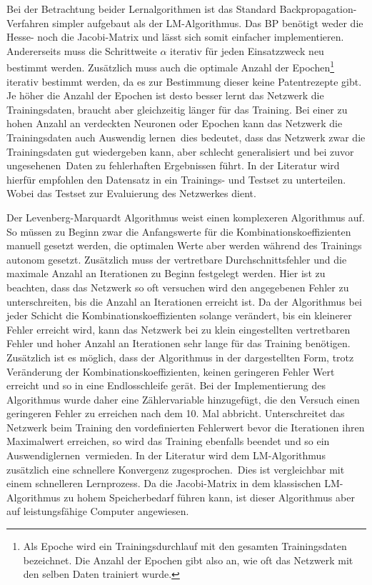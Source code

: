 Bei der Betrachtung beider Lernalgorithmen ist das Standard Backpropagation-Verfahren simpler aufgebaut als der LM-Algorithmus. Das BP benötigt weder die Hesse- noch die Jacobi-Matrix und lässt sich somit einfacher implementieren. Andererseits muss die Schrittweite $\alpha$ iterativ für jeden Einsatzzweck neu bestimmt werden. Zusätzlich muss auch die optimale Anzahl der Epochen\footnote{Als Epoche wird ein Trainingsdurchlauf mit den gesamten Trainingsdaten bezeichnet. Die Anzahl der Epochen gibt also an, wie oft das Netzwerk mit den selben Daten trainiert wurde.%
} iterativ bestimmt werden, da es zur Bestimmung dieser keine Patentrezepte gibt. Je höher die Anzahl der Epochen ist desto besser lernt das Netzwerk die Trainingsdaten, braucht aber gleichzeitig länger für das Training. Bei einer zu hohen Anzahl an verdeckten Neuronen oder Epochen kann das Netzwerk die Trainingsdaten auch \glqq Auswendig lernen\grqq~dies bedeutet, dass das Netzwerk zwar die Trainingsdaten gut wiedergeben kann, aber schlecht generalisiert und bei zuvor \glqq ungesehenen\grqq~Daten zu fehlerhaften Ergebnissen führt. In der Literatur wird hierfür empfohlen den Datensatz in ein Trainings- und Testset zu unterteilen. Wobei das Testset zur Evaluierung des Netzwerkes dient.\,

Der Levenberg-Marquardt Algorithmus weist einen komplexeren Algorithmus auf. So müssen zu Beginn zwar die Anfangswerte für die Kombinationskoeffizienten manuell gesetzt werden, die optimalen Werte aber werden während des Trainings autonom gesetzt. Zusätzlich muss der vertretbare Durchschnittsfehler und die maximale Anzahl an Iterationen zu Beginn festgelegt werden. Hier ist zu beachten, dass das Netzwerk so oft versuchen wird den angegebenen Fehler zu unterschreiten, bis die Anzahl an Iterationen erreicht ist. Da der Algorithmus bei jeder Schicht die Kombinationskoeffizienten solange verändert, bis ein kleinerer Fehler erreicht wird, kann das Netzwerk bei zu klein eingestellten vertretbaren Fehler und hoher Anzahl an Iterationen sehr lange für das Training benötigen. Zusätzlich ist es möglich, dass der Algorithmus in der dargestellten Form, trotz Veränderung der Kombinationskoeffizienten, keinen geringeren Fehler Wert erreicht und so in eine Endlosschleife gerät. Bei der Implementierung des Algorithmus wurde daher eine Zählervariable hinzugefügt, die den Versuch einen geringeren Fehler zu erreichen nach dem 10. Mal abbricht. Unterschreitet das Netzwerk beim Training den vordefinierten Fehlerwert bevor die Iterationen ihren Maximalwert erreichen, so wird das Training ebenfalls beendet und so ein \glqq Auswendiglernen\grqq~vermieden. In der Literatur wird dem LM-Algorithmus zusätzlich eine schnellere Konvergenz zugesprochen.\, Dies ist vergleichbar mit einem schnelleren Lernprozess. Da die Jacobi-Matrix in dem klassischen LM-Algorithmus zu hohem Speicherbedarf führen kann, ist dieser Algorithmus aber auf leistungsfähige Computer angewiesen. 


